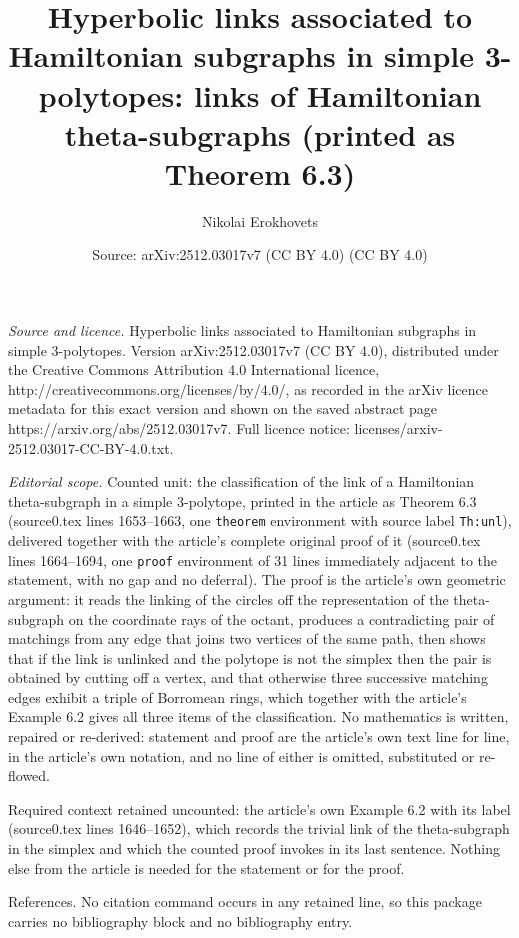 \documentclass[10pt,a4paper]{amsart}
\title[Hyperbolic links associated to Hamiltonian subgraphs in simple 3-polytopes]{Hyperbolic links associated to Hamiltonian subgraphs in simple 3-polytopes: links of Hamiltonian theta-subgraphs (printed as Theorem 6.3)}
\author{Nikolai Erokhovets}
\date{Source: arXiv:2512.03017v7 (CC BY 4.0) (CC BY 4.0)}
\theoremstyle{plain}
\theoremstyle{definition}
\theoremstyle{remark}
\begin{document}
\maketitle

\noindent\emph{Source and licence.} Hyperbolic links associated to Hamiltonian subgraphs in simple 3-polytopes. Version arXiv:2512.03017v7 (CC BY 4.0), distributed under the Creative Commons Attribution 4.0 International licence, http://creativecommons.org/licenses/by/4.0/, as recorded in the arXiv licence metadata for this exact version and shown on the saved abstract page https://arxiv.org/abs/2512.03017v7. Full licence notice: licenses/arxiv-2512.03017-CC-BY-4.0.txt.\par\smallskip

\noindent\textit{Editorial scope.} Counted unit: the classification of the link of a Hamiltonian theta-subgraph in a simple 3-polytope, printed in the article as Theorem 6.3 (source0.tex lines 1653--1663, one \texttt{theorem} environment with source label \texttt{Th:unl}), delivered together with the article's complete original proof of it (source0.tex lines 1664--1694, one \texttt{proof} environment of 31 lines immediately adjacent to the statement, with no gap and no deferral). The proof is the article's own geometric argument: it reads the linking of the circles off the representation of the theta-subgraph on the coordinate rays of the octant, produces a contradicting pair of matchings from any edge that joins two vertices of the same path, then shows that if the link is unlinked and the polytope is not the simplex then the pair is obtained by cutting off a vertex, and that otherwise three successive matching edges exhibit a triple of Borromean rings, which together with the article's Example 6.2 gives all three items of the classification. No mathematics is written, repaired or re-derived: statement and proof are the article's own text line for line, in the article's own notation, and no line of either is omitted, substituted or re-flowed.

Required context retained uncounted: the article's own Example 6.2 with its label (source0.tex lines 1646--1652), which records the trivial link of the theta-subgraph in the simplex and which the counted proof invokes in its last sentence. Nothing else from the article is needed for the statement or for the proof.

References. No citation command occurs in any retained line, so this package carries no bibliography block and no bibliography entry.
\end{document}
